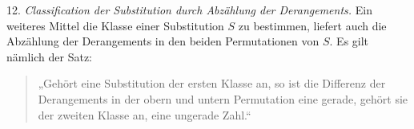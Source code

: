 \documentclass[10pt]{article}
\begin{document}
12. \emph{Classification der Substitution durch Abzählung der Derangements.} Ein weiteres Mittel die Klasse einer Substitution \(S\) zu bestimmen, liefert auch die Abzählung der Derangements in den beiden Permutationen von \(S\). Es gilt nämlich der Satz:
\begin{quote}
„Gehört eine Substitution der ersten Klasse an, so ist die Differenz der Derangements in der obern und untern Permutation eine gerade, gehört sie der zweiten Klasse an, eine ungerade Zahl.“
\end{quote}
\end{document}
